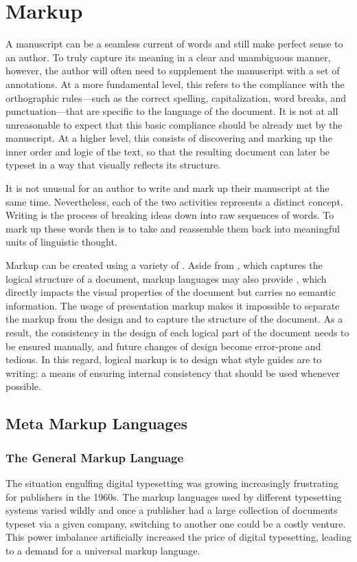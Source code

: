 \chapter{Markup}
A manuscript can be a seamless current of words and still make perfect sense to
an author. To truly capture its meaning in a clear and unambiguous manner,
however, the author will often need to supplement the manuscript with a set of
annotations. At a more fundamental level, this refers to the compliance with the
orthographic rules---such as the correct spelling, capitalization, word breaks,
and punctuation---that are specific to the language of the document. It is not
at all unreasonable to expect that this basic compliance should be already met
by the manuscript. At a higher level, this consists of discovering and marking
up the inner order and logic of the text, so that the resulting document can
later be typeset in a way that visually reflects its structure.

It is not unusual for an author to write and mark up their manuscript at the
same time. Nevertheless, each of the two activities represents a distinct
concept. Writing is the process of breaking ideas down into raw sequences of
words. To mark up these words then is to take and reassemble them back into
meaningful units of linguistic thought.

Markup can be created using a variety of . Aside from
, which captures the logical structure of a document,
markup languages may also provide , which directly
impacts the visual properties of the document but carries no semantic
information. The usage of presentation markup makes it impossible to separate
the markup from the design and to capture the structure of the document. As a
result, the consistency in the design of each logical part of the document needs
to be ensured manually, and future changes of design become error-prone and
tedious. In this regard, logical markup is to design what style guides are to
writing: a means of ensuring internal consistency that should be used whenever
possible.

\section{Meta Markup Languages}
\subsection{The General Markup Language}
The situation engulfing digital typesetting was growing increasingly frustrating
for publishers in the 1960s. The markup languages used by different typesetting
systems varied wildly and once a publisher had a large collection of documents
typeset via a given company, switching to another one could be a costly
venture. This power imbalance artificially increased the price of digital
typesetting, leading to a demand for a universal markup language.

